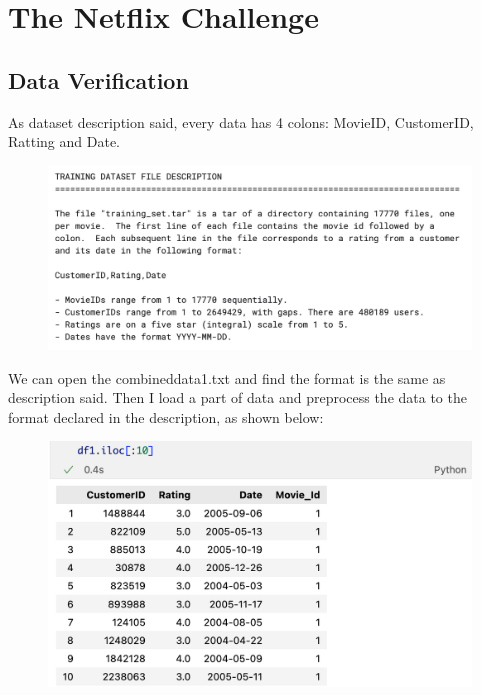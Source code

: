\documentclass{article}
\begin{document}
\section{The Netflix Challenge}
\subsection{Data Verification}
As dataset description said, every data has 4 colons: MovieID, CustomerID, Ratting and Date. 
\begin{center}
\begin{figure}[H]
\centering
\includegraphics[width=13cm]{images/dataset_description.png}
\end{figure}
\end{center}

\noindent We can open the combined\textunderscore data1.txt and find the format is the same as description said. Then I load a part of data and preprocess the data to the format declared in the description, as shown below:
\begin{center}
\begin{figure}[H]
\centering
\includegraphics[width=13cm]{images/show_data.png}
\end{figure}
\end{center}
\end{document}
